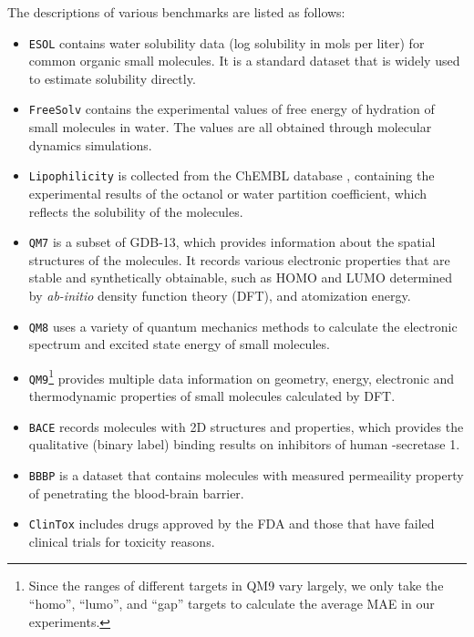 \documentclass{article}
\begin{document}
The descriptions of various benchmarks are listed as follows:
\begin{itemize}
    \item \texttt{ESOL} \cite{DBLP:journals/jcisd/Delaney04} contains water solubility data (log solubility in mols per liter) for common organic small molecules. It is a standard dataset that is widely used to estimate solubility directly.
    \item  \texttt{FreeSolv} \cite{DBLP:journals/jcamd/MobleyG14} contains the experimental values of free energy of hydration of small molecules in water. The values are all obtained through molecular dynamics simulations. 
     \item \texttt{Lipophilicity} \cite{DBLP:journals/nar/GaultonBBCDHLMMAO12} is collected from the ChEMBL database \cite{DBLP:journals/nar/GaultonBBCDHLMMAO12}, containing the experimental results of the octanol or water partition coefficient, which reflects the solubility of the molecules. 
    \item \texttt{QM7} \cite{blum2009970} is a subset of GDB-13, which provides information about the spatial structures of the molecules. It records various electronic properties that are stable and synthetically obtainable, such as HOMO and LUMO determined by \textit{ab-initio} density function theory (DFT), and atomization energy.
    \item  \texttt{QM8} \cite{ramakrishnan2015electronic} uses a variety of quantum mechanics methods to calculate the electronic spectrum and excited state energy of small molecules.
    \item  \texttt{QM9}\footnote{Since the ranges of different targets in QM9 vary largely, we only take the ``homo'', ``lumo'', and ``gap'' targets to calculate the average MAE in our experiments.} \cite{DBLP:journals/jcisd/RuddigkeitDBR12} provides multiple data information on geometry, energy, electronic and thermodynamic properties of small molecules calculated by DFT.
    \item \texttt{BACE} \cite{subramanian2016computational} records molecules with 2D structures and properties, which provides the qualitative (binary label) binding results on inhibitors of human -secretase 1.
\item \texttt{BBBP} \cite{DBLP:journals/jcisd/MartinsTPF12} is a dataset that contains molecules with measured permeaility property of penetrating the blood-brain barrier.
    \item \texttt{ClinTox} \cite{gayvert2016data} includes drugs approved by the FDA and those that have failed clinical trials for toxicity reasons. 

\end{itemize}
\end{document}
